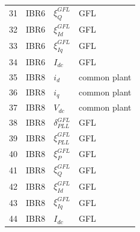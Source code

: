 \begin{longtable}{@{}r l l l@{}}
31 & IBR6 & $\xi_{Q}^{GFL}$ & GFL \\ 
32 & IBR6 & $\xi_{Id}^{GFL}$ & GFL \\ 
33 & IBR6 & $\xi_{Iq}^{GFL}$ & GFL \\ 
34 & IBR6 & $I_{dc}$ & GFL \\ 
35 & IBR8 & $i_d$ & common plant \\ 
36 & IBR8 & $i_q$ & common plant \\ 
37 & IBR8 & $V_{dc}$ & common plant \\ 
38 & IBR8 & $\delta_{PLL}^{GFL}$ & GFL \\ 
39 & IBR8 & $\xi_{PLL}^{GFL}$ & GFL \\ 
40 & IBR8 & $\xi_{P}^{GFL}$ & GFL \\ 
41 & IBR8 & $\xi_{Q}^{GFL}$ & GFL \\ 
42 & IBR8 & $\xi_{Id}^{GFL}$ & GFL \\ 
43 & IBR8 & $\xi_{Iq}^{GFL}$ & GFL \\ 
44 & IBR8 & $I_{dc}$ & GFL \\ 
\bottomrule
\end{longtable}
